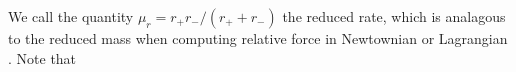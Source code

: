 We call the quantity \(\mu_r = r_+r_-/(r_+ + r_-)\) the reduced rate, which is analagous to the reduced mass when computing relative force in Newtownian or Lagrangian .  Note that